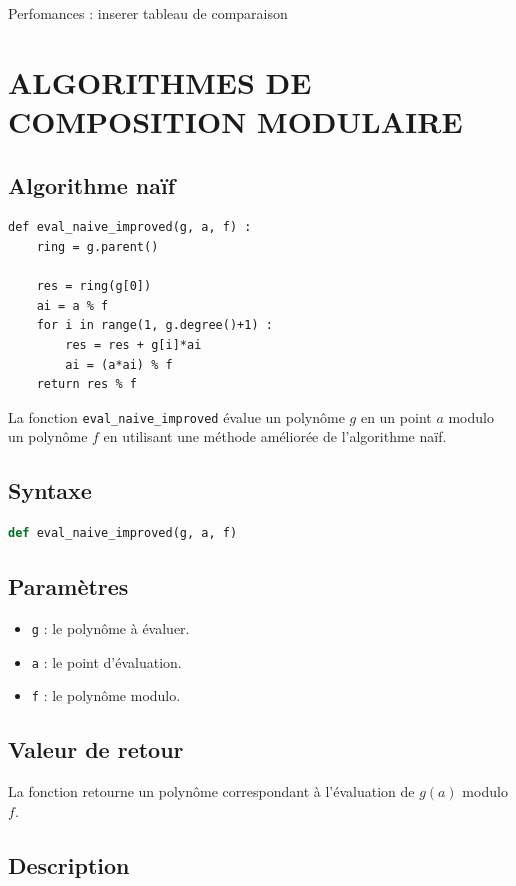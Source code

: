 \documentclass[a4paper]{article}
\begin{document}
Perfomances : inserer tableau de comparaison  \cite{aecf}

\section{ALGORITHMES DE COMPOSITION MODULAIRE}
\subsection{Algorithme naïf}

\begin{lstlisting}[frame=leftline, title={naive}]
def eval_naive_improved(g, a, f) :
	ring = g.parent()

	res = ring(g[0])
	ai = a % f
	for i in range(1, g.degree()+1) :
		res = res + g[i]*ai
		ai = (a*ai) % f
	return res % f
\end{lstlisting}
La fonction \texttt{eval\_naive\_improved} évalue un polynôme $g$ en un point $a$ modulo un polynôme $f$ en utilisant une méthode améliorée de l'algorithme naïf.

\subsection*{Syntaxe}

\begin{lstlisting}[language=Python]
def eval_naive_improved(g, a, f)
\end{lstlisting}

\subsection*{Paramètres}

\begin{itemize}
  \item \texttt{g} : le polynôme à évaluer.
  \item \texttt{a} : le point d'évaluation.
  \item \texttt{f} : le polynôme modulo.
\end{itemize}

\subsection*{Valeur de retour}

La fonction retourne un polynôme correspondant à l'évaluation de $g(a)$ modulo $f$.

\subsection*{Description}
\end{document}
